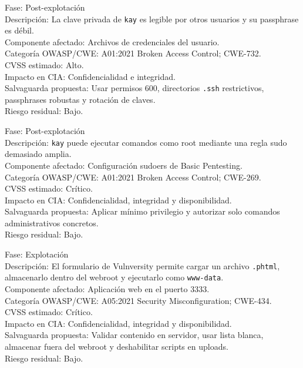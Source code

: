 \documentclass[11pt,a4paper]{article}
\begin{document}
\begin{campo}
Fase: Post-explotación\\
Descripción: La clave privada de \texttt{kay} es legible por otros usuarios y su passphrase es débil.\\
Componente afectado: Archivos de credenciales del usuario.\\
Categoría OWASP/CWE: A01:2021 Broken Access Control; CWE-732.\\
CVSS estimado: Alto.\\
Impacto en CIA: Confidencialidad e integridad.\\
Salvaguarda propuesta: Usar permisos 600, directorios \texttt{.ssh} restrictivos, passphrases robustas y rotación de claves.\\
Riesgo residual: Bajo.
\end{campo}

\begin{campo}
Fase: Post-explotación\\
Descripción: \texttt{kay} puede ejecutar comandos como root mediante una regla sudo demasiado amplia.\\
Componente afectado: Configuración sudoers de Basic Pentesting.\\
Categoría OWASP/CWE: A01:2021 Broken Access Control; CWE-269.\\
CVSS estimado: Crítico.\\
Impacto en CIA: Confidencialidad, integridad y disponibilidad.\\
Salvaguarda propuesta: Aplicar mínimo privilegio y autorizar solo comandos administrativos concretos.\\
Riesgo residual: Bajo.
\end{campo}

\begin{campo}
Fase: Explotación\\
Descripción: El formulario de Vulnversity permite cargar un archivo \texttt{.phtml}, almacenarlo dentro del webroot y ejecutarlo como \texttt{www-data}.\\
Componente afectado: Aplicación web en el puerto 3333.\\
Categoría OWASP/CWE: A05:2021 Security Misconfiguration; CWE-434.\\
CVSS estimado: Crítico.\\
Impacto en CIA: Confidencialidad, integridad y disponibilidad.\\
Salvaguarda propuesta: Validar contenido en servidor, usar lista blanca, almacenar fuera del webroot y deshabilitar scripts en uploads.\\
Riesgo residual: Bajo.
\end{campo}
\end{document}
